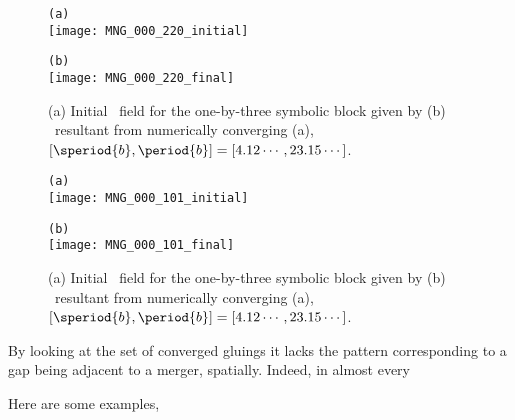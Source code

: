 \begin{itemize}
{%
\begin{figure}
\begin{minipage}[height=.4\textheight]{.5\textwidth}
\centering \small{\texttt{(a)}}\\
\texttt{[image: MNG\_000\_220\_initial]}
\end{minipage}
\begin{minipage}[height=.4\textheight]{.5\textwidth}
\centering \small{\texttt{(b)}}\\
\texttt{[image: MNG\_000\_220\_final]}
\end{minipage}
\caption{ \label{fig:block001}
(a) Initial \spt\ field for the one-by-three symbolic block given by 
(b) \twoT\ resultant from numerically converging (a),
$[\speriod{b},\period{b}]=[4.12\cdots,23.15\cdots ]$.
}
\end{figure}

\begin{figure}
\begin{minipage}[height=.4\textheight]{.5\textwidth}
\centering \small{\texttt{(a)}}\\
\texttt{[image: MNG\_000\_101\_initial]}
\end{minipage}
\begin{minipage}[height=.4\textheight]{.5\textwidth}
\centering \small{\texttt{(b)}}\\
\texttt{[image: MNG\_000\_101\_final]}
\end{minipage}
\caption{ \label{fig:block000_101}
(a) Initial \spt\ field for the one-by-three symbolic block given by 
(b) \twoT\ resultant from numerically converging (a),
$[\speriod{b},\period{b}]=[4.12\cdots,23.15\cdots ]$.
}
\end{figure}

By looking at the set of converged gluings it lacks the pattern corresponding
to a gap being adjacent to a merger, spatially. %
Indeed, in almost every

Here are some examples,


}
\end{itemize}
